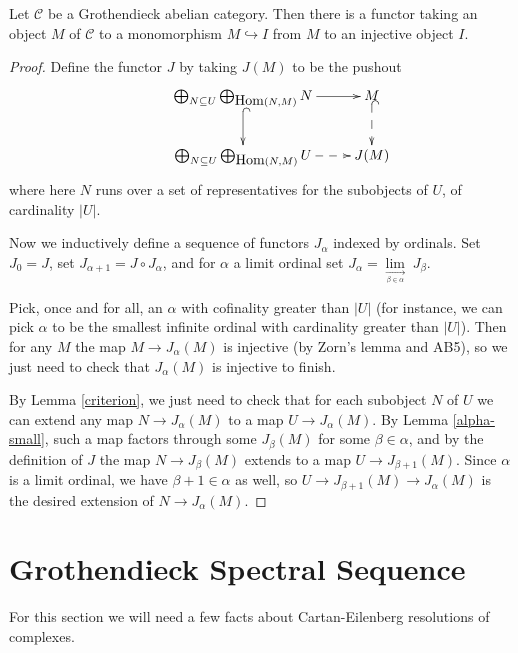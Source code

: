 \begin{thm}\label{injectives} Let $\mathcal{C}$ be a Grothendieck abelian category. Then there is a functor taking an object $M$ of $\mathcal{C}$ to a monomorphism $M\hookrightarrow I$ from $M$ to an injective object $I$.
\end{thm}
\begin{proof} Define the functor $J$ by taking $J(M)$ to be the pushout
\begin{align*}
\xymatrix{&\bigoplus_{N\subseteq U}\bigoplus_{\mbox{Hom}(N,M)}N \ar[r] \ar@{^{(}->}[d] & M \ar@{^{(}-->}[d]\\
&\bigoplus_{N\subseteq U}\bigoplus_{\mbox{Hom}(N,M)}U \ar@{-->}[r] & J(M)}
\end{align*}
where here $N$ runs over a set of representatives for the subobjects of $U$, of cardinality $|U|$.

Now we inductively define a sequence of functors $J_\alpha$ indexed by ordinals. Set $J_0 = J$, set $J_{\alpha+1} = J\circ J_\alpha$, and for $\alpha$ a limit ordinal set $J_\alpha = \underset{\underset{\beta\in\alpha}{\longrightarrow}}{\lim}\;J_\beta$.

Pick, once and for all, an $\alpha$ with cofinality greater than $|U|$ (for instance, we can pick $\alpha$ to be the smallest infinite ordinal with cardinality greater than $|U|$). Then for any $M$ the map $M\rightarrow J_\alpha(M)$ is injective (by Zorn's lemma and AB5), so we just need to check that $J_\alpha(M)$ is injective to finish.

By Lemma \ref{criterion}, we just need to check that for each subobject $N$ of $U$ we can extend any map $N\rightarrow J_\alpha(M)$ to a map $U\rightarrow J_\alpha(M)$. By Lemma \ref{alpha-small}, such a map factors through some $J_\beta(M)$ for some $\beta\in\alpha$, and by the definition of $J$ the map $N\rightarrow J_\beta(M)$ extends to a map $U\rightarrow J_{\beta+1}(M)$. Since $\alpha$ is a limit ordinal, we have $\beta+1\in \alpha$ as well, so $U\rightarrow J_{\beta+1}(M)\rightarrow J_{\alpha}(M)$ is the desired extension of $N\rightarrow J_\alpha(M)$.
\end{proof}

\section{Grothendieck Spectral Sequence}

For this section we will need a few facts about Cartan-Eilenberg resolutions of complexes.


